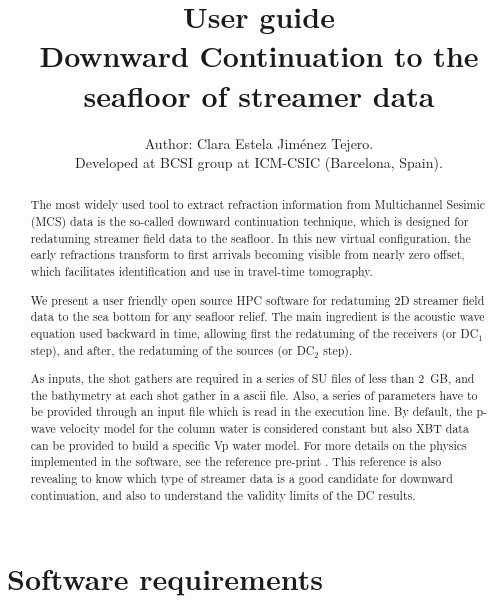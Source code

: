\documentclass[11pt, oneside]{article}   	%
\title{\textbf{User guide}\\Downward Continuation to the seafloor of streamer data}
\author{Author: Clara Estela Jim\'enez Tejero. \\
Developed at BCSI group at ICM-CSIC (Barcelona, Spain).}
\date{}							%
\begin{document}
\maketitle
\begin{abstract}
%

The most widely used tool to extract refraction information from Multichannel Sesimic (MCS) data is the so-called downward continuation technique, which is designed for redatuming streamer field data to the seafloor. In this new virtual configuration, the early refractions transform to first arrivals becoming visible from nearly zero offset, which facilitates identification and use in travel-time tomography. 

We present a user friendly open source HPC software for redatuming 2D streamer field data to the sea bottom for any seafloor relief. The main ingredient is the acoustic wave equation used backward in time, allowing first the redatuming of the receivers (or DC$_1$ step), and after, the redatuming of the sources (or DC$_2$ step).

As inputs, the shot gathers are required in a series of SU files of less than 2~GB, and the bathymetry at each shot gather in a ascii file. Also, a series of parameters have to be provided through an input file which is read in the execution line. By default, the p-wave velocity model for the column water is considered constant but also XBT data can be provided to build a specific Vp water model. For more details on the physics implemented in the software, see the reference pre-print \cite{estela}. This reference is also revealing to know which type of streamer data is a good candidate for downward continuation, and also to understand the validity limits of the DC results.

\end{abstract}

\newpage

\section{Software requirements}\label{sec1}
\end{document}
